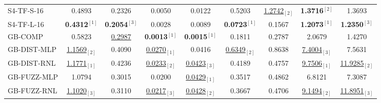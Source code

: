 \begin{table*}[h]
{\begin{tabular}{lcc|cc|cc|cc}
            \midrule
            S4-TF-S-16 
                & 0.4893 & 0.2326
                & 0.0050 & 0.0122 & 0.5203 & \underline{1.2742}$_{[2]}$ & \textbf{1.3716}$^{[2]}$ & 1.3693\\
            S4-TF-L-16 
                & \textbf{0.4312}$^{[1]}$ & \textbf{0.2054}$^{[3]}$
                & 0.0028 & 0.0089 & \textbf{0.0723}$^{[1]}$ & 0.1567 & \textbf{1.2073}$^{[1]}$ & \textbf{1.2350}$^{[3]}$\\
            \midrule
            GB-COMP 
                & 0.5823 & \underline{0.2987}
                & \textbf{0.0013}$^{[1]}$ & \textbf{0.0015}$^{[1]}$ & 0.1811 & 0.2787 & 2.0679 & 1.4270\\
            \midrule
            GB-DIST-MLP 
                & \underline{1.1569}$_{[2]}$ & 0.4090
                & \underline{0.0270}$_{[1]}$ & 0.0416 & \underline{0.6349}$_{[2]}$ & 0.8638 & \underline{7.4004}$_{[3]}$ & 7.5631\\
            GB-DIST-RNL 
                & \underline{1.1771}$_{[1]}$ & 0.4236
                & \underline{0.0233}$_{[2]}$ & \underline{0.0423}$_{[3]}$ & 0.4189 & 0.4757 & \underline{9.7506}$_{[1]}$ & \underline{11.9285}$_{[2]}$\\
            \midrule
            GB-FUZZ-MLP 
                & 1.0794 & 0.3015
                & 0.0200 & \underline{0.0429}$_{[1]}$ & 0.3517 & 0.4862 & 6.8121 & 7.3087\\
            GB-FUZZ-RNL 
                & \underline{1.1020}$_{[3]}$ & 0.3110
                & \underline{0.0217}$_{[3]}$ & \underline{0.0428}$_{[2]}$ & 0.3667 & 0.4706	& \underline{9.1494}$_{[2]}$ & \underline{11.8951}$_{[3]}$\\
            \midrule
            \midrule
    \end{tabular}
    }
\end{table*}